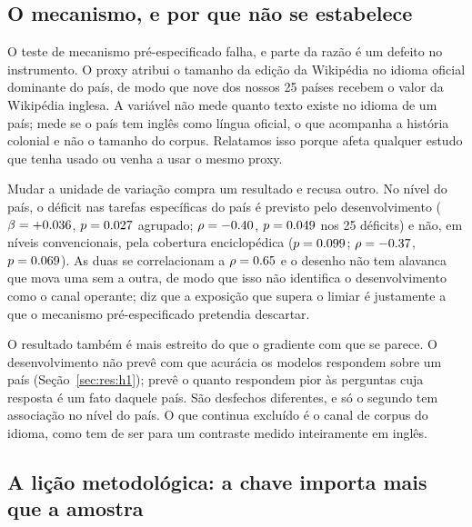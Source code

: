 \subsection{O mecanismo, e por que não se estabelece}

O teste de mecanismo pré-especificado falha, e parte da razão é um defeito no
instrumento. O proxy atribui o tamanho da edição da Wikipédia no idioma oficial
dominante do país, de modo que nove dos nossos 25 países recebem o valor da
Wikipédia inglesa. A variável não mede quanto texto existe no idioma de um país;
mede se o país tem inglês como língua oficial, o que acompanha a história
colonial e não o tamanho do corpus. Relatamos isso porque afeta qualquer estudo
que tenha usado ou venha a usar o mesmo proxy.

Mudar a unidade de variação compra um resultado e recusa outro. No nível do
país, o déficit nas tarefas específicas do país é previsto pelo desenvolvimento
($\beta=+0.036$, $p=0.027$ agrupado;
$\rho=-0.40$, $p=0.049$ nos 25 déficits) e não, em níveis
convencionais, pela cobertura enciclopédica ($p=0.099$;
$\rho=-0.37$, $p=0.069$). As duas se correlacionam a
$\rho=0.65$ e o desenho não tem alavanca que mova uma sem a outra, de
modo que isso não identifica o desenvolvimento como o canal operante; diz que a
exposição que supera o limiar é justamente a que o mecanismo pré-especificado
pretendia descartar.

O resultado também é mais estreito do que o gradiente com que se parece. O
desenvolvimento não prevê com que acurácia os modelos respondem sobre um país
(Seção~\ref{sec:res:h1}); prevê o quanto respondem pior às perguntas cuja
resposta é um fato daquele país. São desfechos diferentes, e só o segundo tem
associação no nível do país. O que continua excluído é o canal de corpus do
idioma, como tem de ser para um contraste medido inteiramente em inglês.

\subsection{A lição metodológica: a chave importa mais que a amostra}

